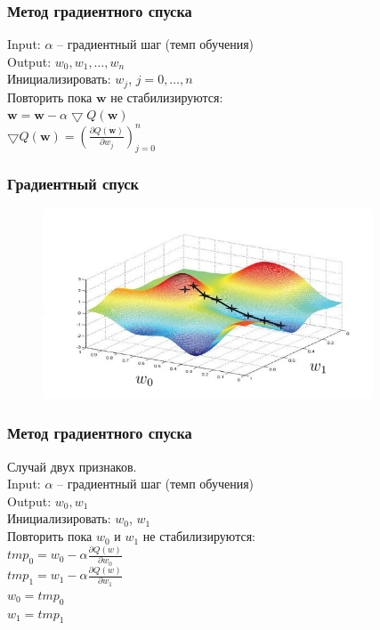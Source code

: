 \documentclass[10pt]{beamer}
\begin{document}
\begin{frame}\frametitle{Метод градиентного спуска}
	Input: $\alpha$ -- градиентный шаг (темп обучения)\\
	Output: $w_0, w_1, \dots, w_n$\\
	\vspace{3mm}
	Инициализировать: $w_j$, $j=0,\dots, n$\\
	Повторить пока $\mathbf{w}$ не стабилизируются:\\
	\hspace{10mm} $\mathbf{w} =  \mathbf{w} - \alpha \bigtriangledown Q(\mathbf{w})$\\
	
	\vspace{10mm}
	$\bigtriangledown Q(\mathbf{w}) = (\frac{\partial Q(\mathbf{w})}{\partial w_j})_{j=0}^n$\\
\end{frame}

\begin{frame}\frametitle{Градиентный спуск}
	\begin{figure}[htbp]
	  \includegraphics[height=160pt, keepaspectratio = true]{images/gradient_descent}
	\end{figure}
\end{frame}

\begin{frame}\frametitle{Метод градиентного спуска}
	Случай двух признаков.\\
	Input: $\alpha$ -- градиентный шаг (темп обучения)\\
	Output: $w_0, w_1$\\
	\vspace{3mm}
	Инициализировать: $w_0$, $w_1$\\
	Повторить пока $w_0$ и $w_1$ не стабилизируются:\\
	\hspace{10mm} $tmp_0 =  w_0 - \alpha \frac{\partial Q(w)}{\partial w_0}$\\
	\hspace{10mm} $tmp_1 =  w_1 - \alpha \frac{\partial Q(w)}{\partial w_1}$\\
	\hspace{10mm} $w_0 = tmp_0$\\
	\hspace{10mm} $w_1 = tmp_1$
\end{frame}
\end{document}
